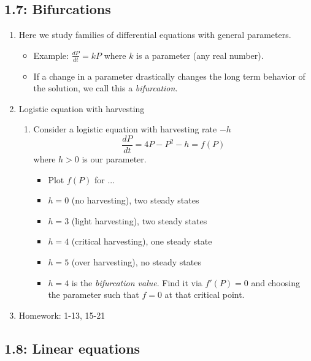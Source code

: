 \documentclass{article}
\begin{document}
\subsection{1.7: Bifurcations}

\begin{enumerate}

\item Here we study families of differential equations with general parameters. 
\begin{itemize}
\item Example: $\frac{dP}{dt} = kP$ where $k$ is a parameter (any real number). 
\item If a change in a parameter drastically changes the long term behavior of the solution, we call this a \emph{bifurcation}.
\end{itemize}

\item Logistic equation with harvesting
\begin{enumerate}
\item Consider a logistic equation with harvesting rate $-h$
\[
\frac{dP}{dt} = 4P-P^2 - h = f(P)
\]
where $h>0$ is our parameter.
\begin{itemize}
\item Plot $f(P)$ for ...
\item $h=0$ (no harvesting), two steady states
\item $h=3$ (light harvesting), two steady states
\item $h=4$ (critical harvesting), one steady state
\item $h=5$ (over harvesting), no steady states
\item $h=4$ is the \emph{bifurcation value}. Find it via $f'(P)=0$ and choosing the parameter such that $f=0$ at that critical point. 
\end{itemize}
\end{enumerate}

\item Homework: 1-13, 15-21

\end{enumerate}


\subsection{1.8: Linear equations}
\end{document}
